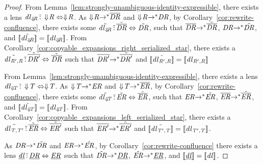 \documentclass[numbers,10pt,preprint\ifanon ,nocopyrightspace\fi]{sigplanconf}
\begin{document}
\begin{proof}
  From Lemma~\ref{lem:strongly-unambiguous-identity-expressible}, there exists a
  lens $\mathit{dl}_{\Downarrow\mkern-4mu \mathit{R}} \,\tilde{:}\,
  \Downarrow\mkern-4mu \mathit{R} \Leftrightarrow \Downarrow\mkern-4mu \mathit{R}$.  As
  $\Downarrow\mkern-4mu \mathit{R} {\rightarrow}^* \overline{\mathit{DR}}$ and
  $\Downarrow\mkern-4mu \mathit{R} {\rightarrow}^* \mathit{DR}$, by
  Corollary~\ref{cor:rewrite-confluence}, there exists some
  $\tilde{\mathit{dl}_{\Downarrow\mkern-4mu \mathit{R}}} \,\tilde{:}\,
  \tilde{\overline{\mathit{DR}}} \Leftrightarrow \tilde{\mathit{DR}}$,
  such that
  $\overline{\mathit{DR}} {\rightarrow}^* \tilde{\overline{\mathit{DR}}}$,
  $\mathit{DR} {\rightarrow}^* \tilde{\mathit{DR}}$, and
  $[ \! [\tilde{\mathit{dl}_{\Downarrow\mkern-4mu \mathit{R}}}] \! ] =
  [ \! [\mathit{dl}_{\Downarrow\mkern-4mu \mathit{R}}] \! ]$.
  From Corollary~\ref{cor:copyable_expansions_right_serialized_star}, there
  exists a $\tilde{\mathit{dl}_{\mathit{R}',\mathit{R}}} \,\tilde{:}\,
  \tilde{\overline{\mathit{DR}'}} \Leftrightarrow \tilde{\overline{\mathit{DR}}}$
  such that $\overline{\mathit{DR}'} {\rightarrow}^*
  \tilde{\overline{\mathit{DR}'}}$ and
  $[ \! [\tilde{\mathit{dl}_{\mathit{R}',\mathit{R}}}] \! ] =
  [ \! [\mathit{dl}_{\mathit{R}',\mathit{R}}] \! ]$

  From Lemma~\ref{lem:strongly-unambiguous-identity-expressible}, there exists a
  lens $\mathit{dl}_{\Downarrow\mkern-4mu \mathit{T}} \,\tilde{:}\,
  \Downarrow\mkern-4mu \mathit{T} \Leftrightarrow \Downarrow\mkern-4mu \mathit{T}$.  As
  $\Downarrow\mkern-4mu \mathit{T} {\rightarrow}^* \mathit{ER}$ and
  $\Downarrow\mkern-4mu \mathit{T} {\rightarrow}^* \overline{\mathit{ER}}$, by
  Corollary~\ref{cor:rewrite-confluence}, there exists some
  $\tilde{\mathit{dl}_{\Downarrow\mkern-4mu \mathit{T}}} \,\tilde{:}\,
  \tilde{\mathit{ER}} \Leftrightarrow \tilde{\overline{\mathit{ER}}}$,
  such that
  $\mathit{ER} {\rightarrow}^* \tilde{\mathit{ER}}$,
  $\overline{\mathit{ER}} {\rightarrow}^* \tilde{\overline{\mathit{ER}}}$, and
  $[ \! [\tilde{\mathit{dl}_{\Downarrow\mkern-4mu \mathit{T}}}] \! ] =
  [ \! [\mathit{dl}_{\Downarrow\mkern-4mu \mathit{T}}] \! ]$.
  From Corollary~\ref{cor:copyable_expansions_left_serialized_star}, there
  exists a $\tilde{\mathit{dl}_{\mathit{T},\mathit{T}'}} \,\tilde{:}\,
  \tilde{\overline{\mathit{ER}}} \Leftrightarrow \tilde{\overline{\mathit{ER}'}}$
  such that $\overline{\mathit{ER}'} {\rightarrow}^*
  \tilde{\overline{\mathit{ER}'}}$ and
  $[ \! [\tilde{\mathit{dl}_{\mathit{T}',\mathit{T}}}] \! ] =
  [ \! [\mathit{dl}_{\mathit{T}',\mathit{T}}] \! ]$.

  As $\mathit{DR} {\rightarrow}^* \tilde{\mathit{DR}}$ and
  $\mathit{ER} {\rightarrow}^* \tilde{\mathit{ER}}$,
  by Corollary~\ref{cor:rewrite-confluence} there exists a lens
  $\underline{\mathit{dl}} \,\tilde{:}\, \underline{\mathit{DR}} \Leftrightarrow
  \underline{\mathit{ER}}$ such that
  $\tilde{\mathit{DR}} {\rightarrow}^* \underline{\mathit{DR}}$,
  $\tilde{\mathit{ER}} {\rightarrow}^* \underline{\mathit{ER}}$, and
  $[ \! [\underline{\mathit{dl}}] \! ] = [ \! [\mathit{dl}] \! ]$.
  

\end{proof}
\end{document}
